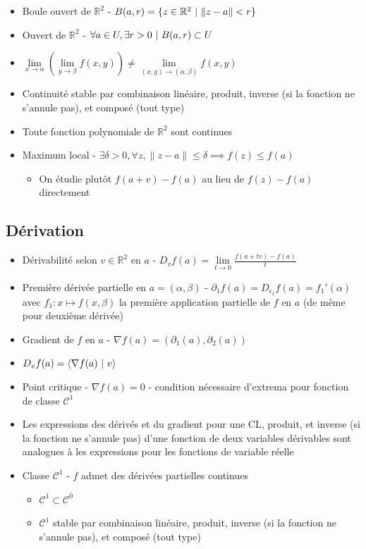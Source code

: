 \documentclass[openany]{book}
\begin{document}
\begin{itemize}
    \item Boule ouvert de $\mathbb{R}^2$ - $B(a, r) = \{ z \in \mathbb{R}^2 \text{ } | \text{ } \|z-a\| < r \}$
    \item Ouvert de $\mathbb{R}^2$ - $\forall a \in U, \exists r > 0 \text{ } | \text{ } B(a, r) \subset U$
    \item $\underset{x \rightarrow \alpha}{\lim} ( \underset{y \rightarrow \beta}{\lim} f(x, y) ) \neq \underset{(x, y) \rightarrow (\alpha, \beta)}{\lim} f(x, y)$
    \item Continuité stable par combinaison linéaire, produit, inverse (si la fonction ne s'annule pas), et composé (tout type)
    \item Toute fonction polynomiale de $\mathbb{R}^2$ sont continues
    \item Maximum local - $\exists \delta > 0, \forall z, \|z-a\| \leq \delta \implies f(z) \leq f(a)$
    \begin{itemize}
        \item On étudie plutôt $f(a+v) - f(a)$ au lieu de $f(z) - f(a)$ directement
    \end{itemize}
\end{itemize}

\subsection{Dérivation}

\begin{itemize}
    \item Dérivabilité selon $v \in \mathbb{R}^2$ en $a$ - $D_v f(a) = \underset{t \rightarrow 0}{\lim} \frac{f(a+tv) - f(a)}{t}$
    \item Première dérivée partielle en $a = (\alpha, \beta)$ - $\partial_1 f(a) = D_{\epsilon_1} f(a) = f_1'(\alpha)$ avec $f_1 : x \mapsto f(x, \beta)$ la première application partielle de $f$ en $a$ (de même pour deuxième dérivée)
    \item Gradient de $f$ en $a$ - $\nabla f (a) = (\partial_1 (a), \partial_2 (a))$
    \item $D_v f(a) = \langle \nabla f(a) \text{ } | \text{ } v \rangle$
    \item Point critique - $\nabla f (a) = 0$ - condition nécessaire d'extrema pour fonction de classe $\mathcal{C}^1$
    \item Les expressions des dérivés et du gradient pour une CL, produit, et inverse (si la fonction ne s'annule pas) d'une fonction de deux variables dérivables sont analogues à les expressions pour les fonctions de variable réelle
    \item Classe $\mathcal{C}^1$ - $f$ admet des dérivées partielles continues 
    \begin{itemize}
        \item $\mathcal{C}^1 \subset \mathcal{C}^0$
        \item $\mathcal{C}^1$ stable par combinaison linéaire, produit, inverse (si la fonction ne s'annule pas), et composé (tout type)
    \end{itemize}
\end{itemize}
\end{document}

